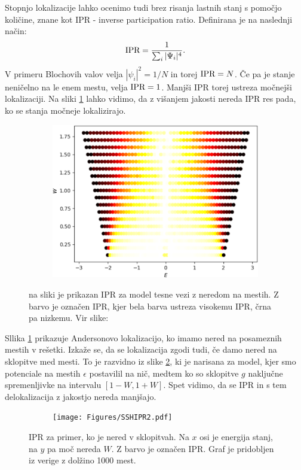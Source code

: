Stopnjo lokalizacije lahko ocenimo tudi brez risanja lastnih stanj s pomočjo količine, znane kot IPR - inverse participation ratio. Definirana je na naslednji način:
\begin{equation}
\textup{IPR} = \frac{1}{\sum_i |\Psi_i|^4}.
\end{equation}
V primeru Blochovih valov velja $|\psi_i|^2 = 1/N$ in torej $\textup{IPR} = N$.
Če pa je stanje neničelno na le enem mestu, velja $\textup{IPR}=1$.
Manjši IPR torej ustreza močnejši lokalizaciji. Na sliki \ref{fig:AndersonIPR} lahko vidimo, da z višanjem jakosti nereda IPR res pada, ko se stanja močneje lokalizirajo.
\begin{figure}[H]
\centering
\begin{subfigure}{.7\textwidth}
\includegraphics[width=\linewidth]{Figures/AndersonIPR.png}
\end{subfigure}
\caption{na sliki je prikazan IPR za model tesne vezi z neredom na mestih. Z barvo je označen IPR, kjer bela barva ustreza visokemu IPR, črna pa nizkemu. Vir slike: \cite{anderson}}
\label{fig:AndersonIPR}
\end{figure}
Sllika \ref{fig:AndersonIPR} prikazuje Andersonovo lokalizacijo, ko imamo nered na posameznih mestih v rešetki. Izkaže se, da se lokalizacija zgodi tudi, če damo nered na sklopitve med mesti. To je razvidno iz slike \ref{fig:SSHIPR}, ki je narisana za model, kjer smo potenciale na mestih $\epsilon$ postavilil na nič, medtem ko so sklopitve $g$ naključne spremenljivke na intervalu $[1-W,1+W]$. Spet vidimo, da se IPR in s tem delokalizacija z jakostjo nereda manjšajo.
\begin{figure}[H]
\centering
\begin{subfigure}{\textwidth}
\texttt{[image: Figures/SSHIPR2.pdf]}
\end{subfigure}
\caption{IPR za primer, ko je nered v sklopitvah. Na $x$ osi je energija stanj, na $y$ pa moč nereda $W$. Z barvo je označen IPR. Graf je pridobljen iz verige z dolžino 1000 mest.}
\label{fig:SSHIPR}
\end{figure}
